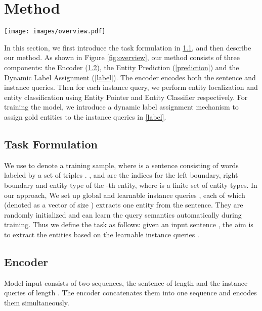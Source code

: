 \documentclass[11pt]{article}
\begin{document}
\section{Method}


\begin{figure*}[h]
  \centering
  \texttt{[image: images/overview.pdf]}
  \caption{The overall architecture of the model. }
  \label{fig:overview}
\end{figure*}

In this section, we first introduce the task formulation in \cref{3.1}, and then describe our method. As shown in Figure \ref{fig:overview}, our method consists of three components: the Encoder (\cref{3.2}), the Entity Prediction (\cref{prediction}) and the Dynamic Label Assignment (\cref{label}). The encoder encodes both the sentence and instance queries. Then for each instance query, we perform entity localization and entity classification using Entity Pointer and Entity Classifier respectively. 
For training the model, we introduce a dynamic label assignment mechanism to assign gold entities to the instance queries in \cref{label}.
 
\subsection{Task Formulation}
\label{3.1}
We use  to denote a training sample, where  is a sentence consisting of  words labeled by a set of triples .
,  and  are the indices for the left boundary, right boundary and entity type of the -th entity, where  is a finite set of entity types.
In our approach, We set up  global and learnable instance queries , each of which (denoted as a vector of size ) extracts one entity from the sentence.
They are randomly initialized and can learn the query semantics automatically during training.
Thus we define the task as follows: given an input sentence , the aim is to extract the entities  based on the learnable instance queries .









\subsection{Encoder}
\label{3.2}

Model input consists of two sequences, the sentence  of length  and the instance queries  of length . The encoder concatenates them into one sequence and encodes them simultaneously.
\end{document}
